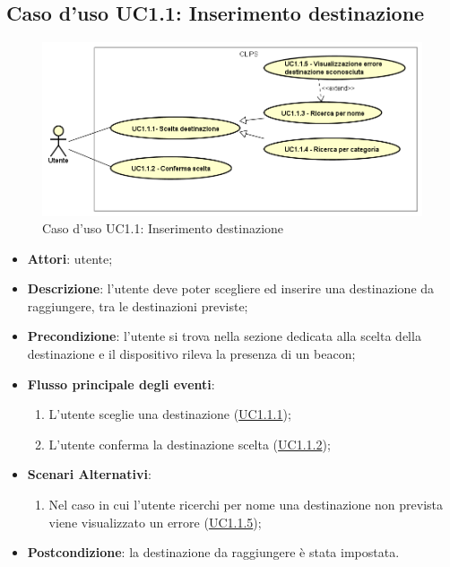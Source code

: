 \documentclass[../AnalisiDeiRequisiti.tex]{subfiles}
\begin{document}
\subsection{Caso d'uso UC1.1: Inserimento destinazione}

        \begin{figure}[!h]
            \centering
            \includegraphics[scale=0.95, width=\textwidth]{img/UC1-1.png}
            \caption{Caso d'uso UC1.1: Inserimento destinazione}\label{fig:UC1.1} 
        \end{figure}
\begin{itemize}
\item \textbf{Attori}: utente;
\item \textbf{Descrizione}: l'utente deve poter scegliere ed inserire una destinazione da raggiungere, tra le destinazioni previste; 
      \item \textbf{Precondizione}: l'utente si trova nella sezione dedicata alla scelta della destinazione e il dispositivo rileva la presenza di un beacon\g;

        \item \textbf{Flusso principale degli eventi}:
          \begin{enumerate}
          \item L'utente sceglie una destinazione  (\hyperlink{UC1.1.1}{UC1.1.1});
          \item L'utente conferma la destinazione scelta  (\hyperlink{UC1.1.2}{UC1.1.2});

      \end{enumerate}
    \item \textbf{Scenari Alternativi}:
      \begin{enumerate}
          \item Nel caso in cui l'utente ricerchi per nome una destinazione non prevista viene visualizzato un errore (\hyperlink{UC1.1.5}{UC1.1.5});

      \end{enumerate}
    \item \textbf{Postcondizione}: la destinazione da raggiungere è stata impostata.
  \end{itemize}
\hypertarget{UC1.1.1}{}
\end{document}
